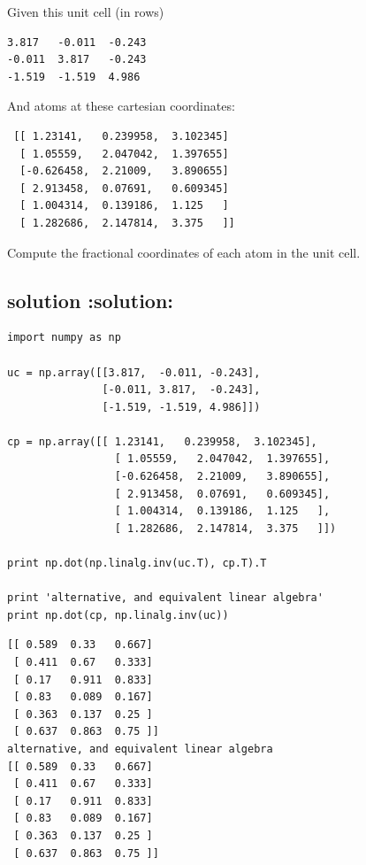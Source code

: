 \documentclass{article}
\begin{document}
Given this unit cell (in rows)

\begin{verbatim}
3.817   -0.011  -0.243
-0.011  3.817   -0.243
-1.519  -1.519  4.986
\end{verbatim}

And atoms at these cartesian coordinates:


\begin{verbatim}
 [[ 1.23141,   0.239958,  3.102345]
  [ 1.05559,   2.047042,  1.397655]
  [-0.626458,  2.21009,   3.890655]
  [ 2.913458,  0.07691,   0.609345]
  [ 1.004314,  0.139186,  1.125   ]
  [ 1.282686,  2.147814,  3.375   ]]
\end{verbatim}

Compute the fractional coordinates of each atom in the unit cell.
\subsection{solution \textbf{:solution:}}
\label{sec-5-1}


\begin{verbatim}
import numpy as np

uc = np.array([[3.817,  -0.011, -0.243],
               [-0.011, 3.817,  -0.243],
               [-1.519, -1.519, 4.986]])

cp = np.array([[ 1.23141,   0.239958,  3.102345],
                 [ 1.05559,   2.047042,  1.397655],
                 [-0.626458,  2.21009,   3.890655],
                 [ 2.913458,  0.07691,   0.609345],
                 [ 1.004314,  0.139186,  1.125   ],
                 [ 1.282686,  2.147814,  3.375   ]])

print np.dot(np.linalg.inv(uc.T), cp.T).T

print 'alternative, and equivalent linear algebra'
print np.dot(cp, np.linalg.inv(uc))
\end{verbatim}


\begin{verbatim}
[[ 0.589  0.33   0.667]
 [ 0.411  0.67   0.333]
 [ 0.17   0.911  0.833]
 [ 0.83   0.089  0.167]
 [ 0.363  0.137  0.25 ]
 [ 0.637  0.863  0.75 ]]
alternative, and equivalent linear algebra
[[ 0.589  0.33   0.667]
 [ 0.411  0.67   0.333]
 [ 0.17   0.911  0.833]
 [ 0.83   0.089  0.167]
 [ 0.363  0.137  0.25 ]
 [ 0.637  0.863  0.75 ]]
\end{verbatim}
\end{document}
